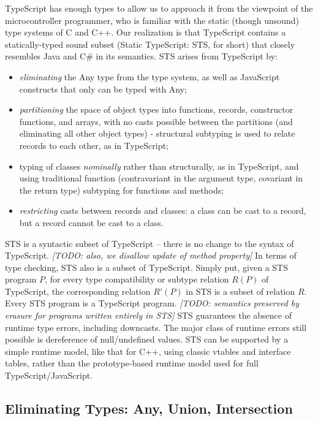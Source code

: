 TypeScript has enough types to allow us to approach it from the viewpoint of the microcontroller programmer, who is 
familiar with the static (though unsound) type systems of C and C++. Our realization is that TypeScript contains a
statically-typed sound subset (Static TypeScript: STS, for short) that closely resembles Java and C\# in its semantics.
STS arises from TypeScript by:
\begin{itemize}
\item \emph{eliminating} the Any type from the type system, as well as JavaScript constructs that only can be typed with Any;
\item \emph{partitioning} the space of object types into functions, records, constructor functions, and arrays, with no casts 
    possible between the partitions (and eliminating all other object types) - structural subtyping is used to relate records 
    to each other, as in TypeScript;
\item typing of classes \emph{nominally} rather than structurally, as in TypeScript, and using traditional function (contravariant 
    in the argument type, covariant in the return type) subtyping for functions and methods;
\item \emph{restricting} casts between records and classes: a class can be cast to a record, but a record cannot be cast to a class.
\end{itemize}
STS is a syntactic subset of TypeScript -- there is no change to the syntax of TypeScript.
\emph{[TODO: also, we disallow update of method property]}
In terms of type checking, STS also is a subset of TypeScript. Simply put, given a STS program $P$,
for every type compatibility or subtype relation $R(P)$ of TypeScript, the corresponding relation $R'(P)$ in STS
is a subset of relation $R$. Every STS program is a TypeScript program. 
\emph{[TODO: semantics preserved by erasure for programs written entirely in STS]}
STS guarantees the absence of runtime type errors, including downcasts.
The major class of runtime errors still possible is dereference of null/undefined values. 
STS can be supported by a simple runtime model, like that for C++, using classic vtables and interface tables,
rather than the prototype-based runtime model used for full TypeScript/JavaScript.

\subsection{Eliminating Types: Any, Union, Intersection}

